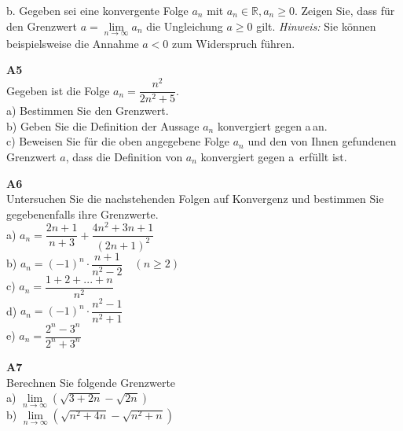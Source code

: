 \documentclass[landscape,twocolumn,a4paper]{article}
\begin{document}
b. Gegeben sei eine konvergente Folge $a_n$ mit $a_n \in \mathbb{R}, a_n \ge 0$. Zeigen Sie, dass
für den Grenzwert $a = \lim \limits_{n \to \infty} a_n$ die Ungleichung $a \ge 0$ gilt. \textit{Hinweis:} Sie
können beispielsweise die Annahme $a < 0$ zum Widerspruch führen.
\bigskip

\textbf{A5} \\
Gegeben ist die Folge $a_n = \dfrac{n^2}{2n^2+5}$. \\
a) Bestimmen Sie den Grenzwert. \\
b) Geben Sie die Definition der Aussage \glqq $a_n$ konvergiert gegen a\grqq\,an. \\
c) Beweisen Sie für die oben angegebene Folge $a_n$ und den von Ihnen gefundenen Grenzwert $a$, dass die
Definition von \glqq $a_n$ konvergiert gegen a\grqq\ erfüllt ist.
\bigskip

\textbf{A6} \\
Untersuchen Sie die nachstehenden Folgen auf Konvergenz und bestimmen Sie gegebenenfalls ihre Grenzwerte. \\
a) $a_n = \dfrac{2n+1}{n+3} + \dfrac{4n^2+3n+1}{(2n+1)^2} $\\
b) $a_n = (-1)^n \cdot \dfrac{n+1}{n^2-2} \quad (n \ge 2)$ \\
c) $a_n = \dfrac{1+2+...+n}{n^2} $ \\
d) $a_n = (-1)^n \cdot \dfrac{n^2-1}{n^2+1}$ \\
e) $a_n = \dfrac{2^n-3^n}{2^n+3^n}$
\bigskip

\textbf{A7} \\
Berechnen Sie folgende Grenzwerte \\
a) $\lim \limits_{n \to \infty} (\sqrt{3+2n}-\sqrt{2n})$ \\
b) $\lim \limits_{n \to \infty} (\sqrt{n^2+4n}-\sqrt{n^2+n})$ 
\end{document}
